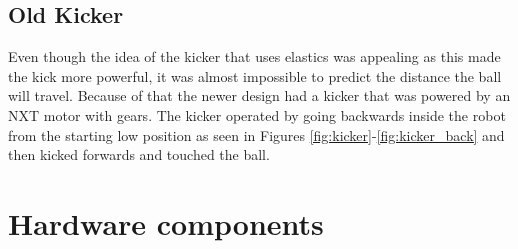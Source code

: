 \documentclass[a4paper,12pt]{article}
\begin{document}
\subsection{Old Kicker}
Even though the idea of the kicker that uses elastics was appealing as this made
the kick more powerful, it was almost impossible to predict the distance the
ball will travel. Because of that the newer design had a
kicker that was powered by an NXT motor with gears. The kicker operated by going backwards inside the robot from the starting low position as seen in Figures \ref{fig:kicker}-\ref{fig:kicker_back} and then kicked
forwards and touched the ball.
%		

\section{Hardware components}
\end{document}
